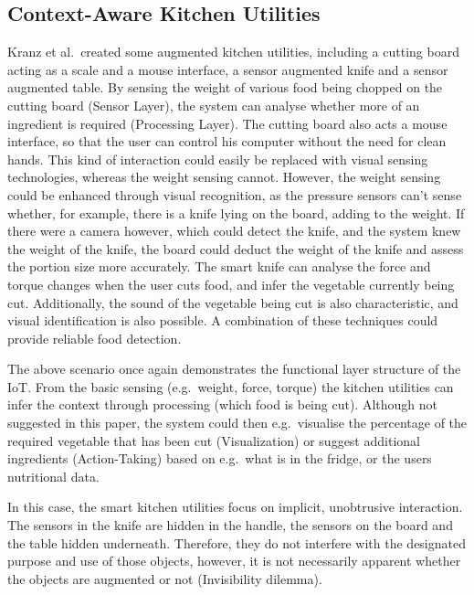 \subsection{Context-Aware Kitchen Utilities}
Kranz et al.\ created some augmented kitchen utilities, including a cutting board acting as a scale and a mouse interface, a sensor augmented knife and a sensor augmented table.
By sensing the weight of various food being chopped on the cutting board (Sensor Layer), the system can analyse whether more of an ingredient is required (Processing Layer).
The cutting board also acts a mouse interface, so that the user can control his computer without the need for clean hands.
This kind of interaction could easily be replaced with visual sensing technologies, whereas the weight sensing cannot.
However, the weight sensing could be enhanced through visual recognition, as the pressure sensors can't sense whether, for example, there is a knife lying on the board, adding to the weight.
If there were a camera however, which could detect the knife, and the system knew the weight of the knife, the board could deduct the weight of the knife and assess the portion size more accurately.
The smart knife can analyse the force and torque changes when the user cuts food, and infer the vegetable currently being cut.
Additionally, the sound of the vegetable being cut is also characteristic, and visual identification is also possible.
A combination of these techniques could provide reliable food detection.

The above scenario once again demonstrates the functional layer structure of the IoT.
From the basic sensing (e.g.\ weight, force, torque) the kitchen utilities can infer the context through processing (which food is being cut).
Although not suggested in this paper, the system could then e.g.\ visualise the percentage of the required vegetable that has been cut (Visualization) or suggest additional ingredients (Action-Taking) based on e.g.\ what is in the fridge, or the users nutritional data.

In this case, the smart kitchen utilities focus on implicit, unobtrusive interaction.
The sensors in the knife are hidden in the handle, the sensors on the board and the table hidden underneath.
Therefore, they do not interfere with the designated purpose and use of those objects, however, it is not necessarily apparent whether the objects are augmented or not (Invisibility dilemma).


